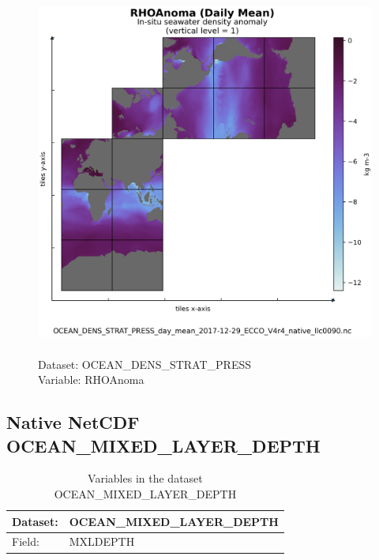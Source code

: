 \begin{figure}[H]
\centering
\includegraphics[scale=0.5]{../images/plots/native_plots/Ocean_Density_Stratification_and_Hydrostatic_Pressure/RHOAnoma.png}
\caption{\\Dataset: OCEAN\_DENS\_STRAT\_PRESS\\Variable: RHOAnoma}
\label{tab:table-OCEAN_DENS_STRAT_PRESS_RHOAnoma-Plot}
\end{figure}
\pagebreak
\subsection{Native NetCDF OCEAN\_MIXED\_LAYER\_DEPTH}
\newp
\begin{longtable}{|p{}|p{}|}
\caption{Variables in the dataset OCEAN\_MIXED\_LAYER\_DEPTH}
\label{tab:table-OCEAN_MIXED_LAYER_DEPTH-fields} \\ 
\hline \endhead \hline \endfoot
\rowcolor{lightgray} \textbf{Dataset:} & \textbf{OCEAN\_MIXED\_LAYER\_DEPTH} \\ \hline
Field: &MXLDEPTH \\ \hline
\end{longtable}

\pagebreak
